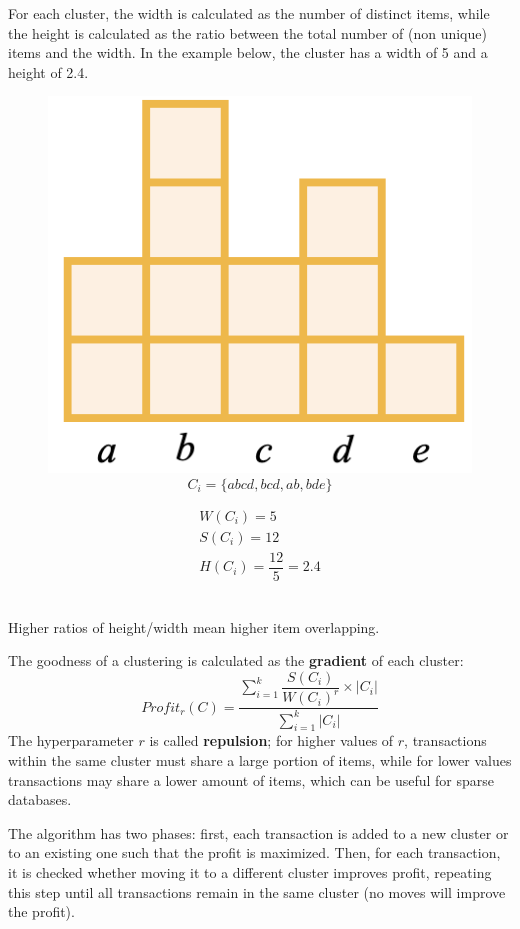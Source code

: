 For each cluster, the width is calculated as the number of distinct items, while the height is calculated as the ratio between the total number of (non unique) items and the width. In the example below, the cluster has a width of 5 and a height of 2.4.
\begin{figure}[h]
    \centering
    \begin{minipage}{0.49\textwidth}
    \centering
    \includegraphics[width=0.5\linewidth]{img/CLOPE_cluster.png}
    \begin{equation*}
        C_i = \{abcd, bcd, ab, bde\}
    \end{equation*}
    \end{minipage}
\hfill
    \begin{minipage}{0.49\textwidth}
        \begin{gather*}
            W(C_i) = 5 \\
            S(C_i) = 12 \\
            H(C_i) = \dfrac{12}{5} = 2.4
        \end{gather*}
    \end{minipage}
\end{figure} \\
Higher ratios of height/width mean higher item overlapping.

The goodness of a clustering is calculated as the \textbf{gradient} of each cluster:
\begin{equation*}
    Profit_r(C) = \dfrac{\sum_{i=1}^k \dfrac{S(C_i)}{W(C_i)^r} \times |C_i|}{\sum_{i=1}^k |C_i|}
\end{equation*}
The hyperparameter $r$ is called \textbf{repulsion}; for higher values of $r$, transactions within the same cluster must share a large portion of items, while for lower values transactions may share a lower amount of items, which can be useful for sparse databases.

The algorithm has two phases: first, each transaction is added to a new cluster or to an existing one such that the profit is maximized. Then, for each transaction, it is checked whether moving it to a different cluster improves profit, repeating this step until all transactions remain in the same cluster (no moves will improve the profit).

